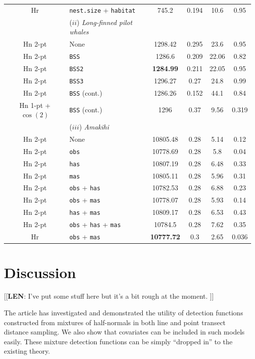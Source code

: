 \documentclass[useAMS,referee, usegraphicx]{biom}
\begin{document}
\begin{table}
\begin{tabular}{c l c c c c}
Hr & \texttt{nest.size} + \texttt{habitat} & 745.2 & 0.194 & 10.6 & 0.95\\
 & ($ii$) \textit{Long-finned pilot whales} & & & & \\
Hn 2-pt & None & 1298.42 & 0.295 & 23.6 & 0.95 \\
Hn 2-pt & \texttt{BSS} & 1286.6 & 0.209 & 22.06 & 0.82 \\
Hn 2-pt & \texttt{BSS2} & \textbf{1284.99} & 0.211 &  22.05 & 0.95\\
Hn 2-pt & \texttt{BSS3} & 1296.27 & 0.27 & 24.8 & 0.99 \\
Hn 2-pt & \texttt{BSS} (cont.) &  1286.26 & 0.152 & 44.1 & 0.84\\
Hn 1-pt + $\cos(2)$& \texttt{BSS} (cont.) & 1296 & 0.37 & 9.56 & 0.319 \\
 & ($iii$) \textit{Amakihi} & & & & \\
Hn 2-pt & None & 10805.48 & 0.28 & 5.14 & 0.12 \\
Hn 2-pt & \texttt{obs} & 10778.69 & 0.28 & 5.8 & 0.04\\
Hn 2-pt & \texttt{has} & 10807.19 &  0.28 & 6.48 & 0.33\\
Hn 2-pt & \texttt{mas} & 10805.11 &  0.28 & 5.96 & 0.31\\
Hn 2-pt & \texttt{obs} + \texttt{has} & 10782.53 & 0.28 & 6.88 & 0.23\\
Hn 2-pt & \texttt{obs} + \texttt{mas} & 10778.07 & 0.28 & 5.93 & 0.14\\
Hn 2-pt & \texttt{has} + \texttt{mas} & 10809.17 & 0.28 & 6.53 & 0.43 \\
Hn 2-pt & \texttt{obs} + \texttt{has} + \texttt{mas} & 10784.5 & 0.28 & 7.62 & 0.35\\
Hr & \texttt{obs} + \texttt{mas} & \textbf{10777.72} & 0.3 & 2.65 & 0.036 \\
\hline
\hline
\end{tabular}
\label{big-results-table}
\end{table}

\section{Discussion}
\label{s:discuss}

[[\textbf{LEN}: I've put some stuff here but it's a bit rough at the moment. ]]

The article has investigated and demonstrated the utility of detection functions constructed from mixtures of half-normals in both line and point transect distance sampling. We also show that covariates can be included in such models easily. These mixture detection functions can be simply ``dropped in'' to the existing theory.
\end{document}
